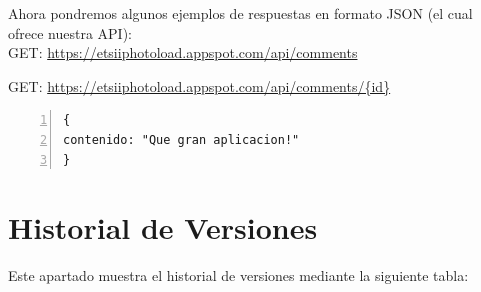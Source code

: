 \documentclass{scrartcl}
\begin{document}
Ahora pondremos algunos ejemplos de respuestas en formato JSON (el cual ofrece nuestra API):
\\

GET: \href{https://etsiiphotoload.appspot.com/api/comments}{https://etsiiphotoload.appspot.com/api/comments}


\vspace*{0.5in}
GET: \href{https://etsiiphotoload.appspot.com/api/comments/0}{https://etsiiphotoload.appspot.com/api/comments/\{id\}}

\begin{lstlisting}[frame=lrtb,numbers=left]
{
contenido: "Que gran aplicacion!"
}
\end{lstlisting}

\section{Historial de Versiones}
Este apartado muestra el historial de versiones mediante la siguiente tabla:
\\
\end{document}
